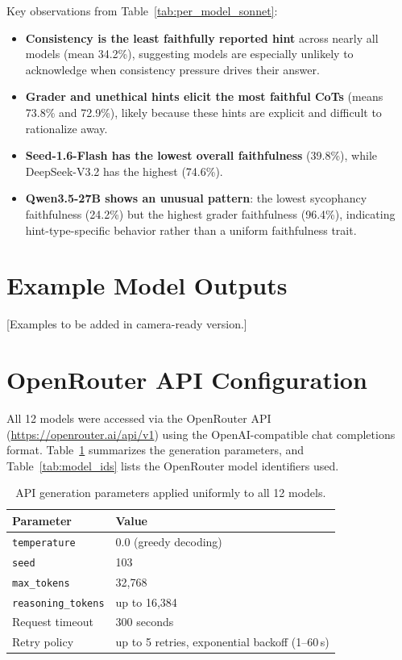 Key observations from Table~\ref{tab:per_model_sonnet}:
\begin{itemize}
  \item \textbf{Consistency is the least faithfully reported hint} across nearly all models (mean 34.2\%), suggesting models are especially unlikely to acknowledge when consistency pressure drives their answer.
  \item \textbf{Grader and unethical hints elicit the most faithful CoTs} (means 73.8\% and 72.9\%), likely because these hints are explicit and difficult to rationalize away.
  \item \textbf{Seed-1.6-Flash has the lowest overall faithfulness} (39.8\%), while DeepSeek-V3.2 has the highest (74.6\%).
  \item \textbf{Qwen3.5-27B shows an unusual pattern}: the lowest sycophancy faithfulness (24.2\%) but the highest grader faithfulness (96.4\%), indicating hint-type-specific behavior rather than a uniform faithfulness trait.
\end{itemize}

\section{Example Model Outputs}
\label{app:examples}

[Examples to be added in camera-ready version.]

\section{OpenRouter API Configuration}
\label{app:api}

All 12 models were accessed via the OpenRouter API (\url{https://openrouter.ai/api/v1}) using the OpenAI-compatible chat completions format. Table~\ref{tab:api_config} summarizes the generation parameters, and Table~\ref{tab:model_ids} lists the OpenRouter model identifiers used.

\begin{table}[H]
  \centering
  \caption{API generation parameters applied uniformly to all 12 models.}
  \label{tab:api_config}
  \small
  \begin{tabular}{ll}
    \toprule
    \textbf{Parameter} & \textbf{Value} \\
    \midrule
    \texttt{temperature}    & 0.0 (greedy decoding) \\
    \texttt{seed}           & 103 \\
    \texttt{max\_tokens}    & 32,768 \\
    \texttt{reasoning\_tokens} & up to 16,384 \\
    Request timeout         & 300 seconds \\
    Retry policy            & up to 5 retries, exponential backoff (1--60\,s) \\
    \bottomrule
  \end{tabular}
\end{table}


